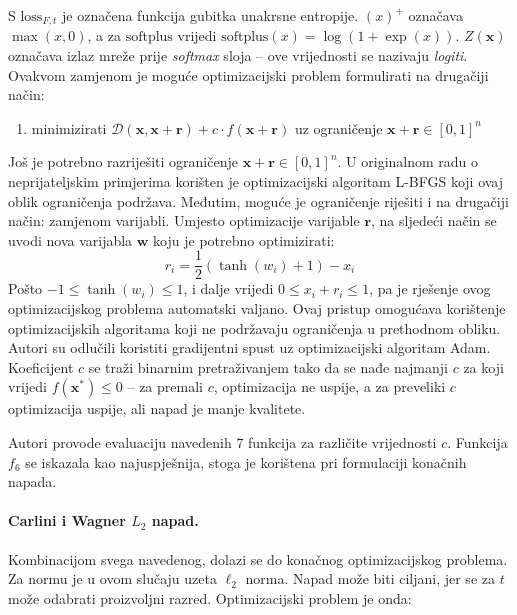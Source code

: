 \documentclass[utf8, diplomski]{fer}
\begin{document}
S $\text{loss}_{F,t}$ je označena funkcija gubitka unakrsne entropije. $(x)^{+}$ označava $\max(x, 0)$, a za $\text{softplus}$ vrijedi $\text{softplus}(x) = \log(1+\exp(x))$. $Z(\boldsymbol{x})$ označava izlaz mreže prije \textit{softmax} sloja -- ove vrijednosti se nazivaju \textit{logiti}. Ovakvom zamjenom je moguće optimizacijski problem formulirati na drugačiji način:

\begin{enumerate}[noitemsep, label={}]
  \item minimizirati $\mathcal{D}(\boldsymbol{x}, \boldsymbol{x} + \boldsymbol{r}) + c\cdot f(\boldsymbol{x} + \boldsymbol{r})$ uz ograničenje $\boldsymbol{x} + \boldsymbol{r} \in [0,1]^{n}$
\end{enumerate}

Još je potrebno razriješiti ograničenje $\boldsymbol{x} + \boldsymbol{r} \in [0,1]^{n}$. U originalnom radu o neprijateljskim primjerima\citep{Szegedy2014IntriguingPO} korišten je optimizacijski algoritam L-BFGS koji ovaj oblik ograničenja podržava. Međutim, moguće je ograničenje riješiti i na drugačiji način: zamjenom varijabli. Umjesto optimizacije varijable $\boldsymbol{r}$, na sljedeći način se uvodi nova varijabla $\boldsymbol{w}$ koju je potrebno optimizirati: 
\begin{equation}
r_{i} = \frac{1}{2}(\tanh(w_{i}) + 1) - x_{i}
\end{equation}
Pošto $-1 \leq \tanh(w_{i}) \leq 1$, i dalje vrijedi $0 \leq x_{i} + r_{i} \leq 1$, pa je rješenje ovog optimizacijskog problema automatski valjano. Ovaj pristup omogućava korištenje optimizacijskih algoritama koji ne podržavaju ograničenja u prethodnom obliku. Autori su odlučili koristiti gradijentni spust uz optimizacijski algoritam Adam. Koeficijent $c$ se traži binarnim pretraživanjem tako da se nađe najmanji $c$ za koji vrijedi $f(\boldsymbol{x}^{*}) \leq 0$ -- za premali $c$, optimizacija ne uspije, a za preveliki $c$ optimizacija uspije, ali napad je manje kvalitete.

Autori provode evaluaciju navedenih $7$ funkcija za različite vrijednosti $c$. Funkcija $f_{6}$ se iskazala kao najuspješnija, stoga je korištena pri formulaciji konačnih napada.

\paragraph{Carlini i Wagner $L_{2}$ napad.} Kombinacijom svega navedenog, dolazi se do konačnog optimizacijskog problema. Za normu je u ovom slučaju uzeta $\ell_{2}$ norma. Napad može biti ciljani, jer se za $t$ može odabrati proizvoljni razred. Optimizacijski problem je onda:
\end{document}
